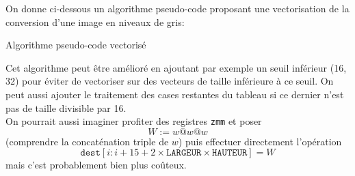 \documentclass[11pt, a4 paper]{article}
\begin{document}
\begin{itemize}
    On donne ci-dessous un algorithme pseudo-code proposant une vectorisation de la conversion d'une image en niveaux de gris:\\
    \begin{algorithm}[H]
        \SetAlgoLined
        \caption{Algorithme pseudo-code vectorisé}
    \end{algorithm}
    Cet algorithme peut être amélioré en ajoutant par exemple un seuil inférieur (16, 32) pour éviter de vectoriser sur des vecteurs de taille inférieure à ce seuil. On peut aussi ajouter le traitement des cases restantes du tableau si ce dernier n'est pas de taille divisible par 16.\\
    On pourrait aussi imaginer profiter des registres \texttt{zmm} et poser $$W := w @ w @ w$$(comprendre la concaténation triple de $w$) puis effectuer directement l'opération $$\texttt{dest}[i:i+15+2\times \texttt{LARGEUR}\times\texttt{HAUTEUR}] = W$$ mais c'est probablement bien plus coûteux.\\
\end{itemize}
\end{document}
